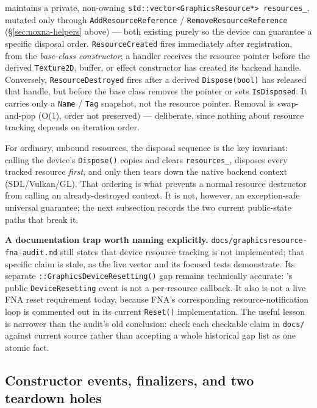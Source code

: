  maintains a private, non-owning
\texttt{std::vector<GraphicsResource*> resources\_}, mutated only through
\texttt{AddResourceReference} / \texttt{RemoveResourceReference} (\S\ref{sec:noxna-helpers} above)
--- both existing purely so the device can guarantee a specific disposal order.
\texttt{ResourceCreated} fires immediately after registration, from the
\emph{base-class constructor}; a handler receives the resource pointer before the derived
\texttt{Texture2D}, buffer, or effect constructor has created its backend handle. Conversely,
\texttt{ResourceDestroyed} fires after a derived \texttt{Dispose(bool)} has released that handle,
but before the base class removes the pointer or sets \texttt{IsDisposed}. It carries only a
\texttt{Name} / \texttt{Tag} snapshot, not the resource pointer. Removal is swap-and-pop (O(1),
order not preserved) --- deliberate, since nothing about resource tracking depends on iteration
order.

For ordinary, unbound resources, the disposal sequence is the key invariant: calling
the device's \texttt{Dispose()} copies and clears \texttt{resources\_}, disposes every tracked
resource \emph{first}, and only then tears down the native backend context (SDL/Vulkan/GL). That
ordering is what prevents a normal resource destructor from calling an already-destroyed context.
It is not, however, an exception-safe universal guarantee; the next subsection records the
two current public-state paths that break it.

\begin{sourcenote}
\textbf{A documentation trap worth naming explicitly.} \texttt{docs/\allowbreak{}graphicsresource-fna-audit.md}
still states that device resource tracking is not implemented; that specific claim is stale, as
the live vector and its focused tests demonstrate. Its separate
\allowbreak\texttt{::GraphicsDeviceResetting()} gap remains technically accurate:
's public \texttt{DeviceResetting} event is not a per-resource
callback. It also is not a live FNA reset requirement today, because FNA's corresponding
resource-notification loop is commented out in its current \texttt{Reset()} implementation.
The useful lesson is narrower than the audit's old conclusion: check each checkable claim in
\texttt{docs/} against current source rather than accepting a whole historical gap list as one
atomic fact.
\end{sourcenote}

\subsection{Constructor events, finalizers, and two teardown holes}

